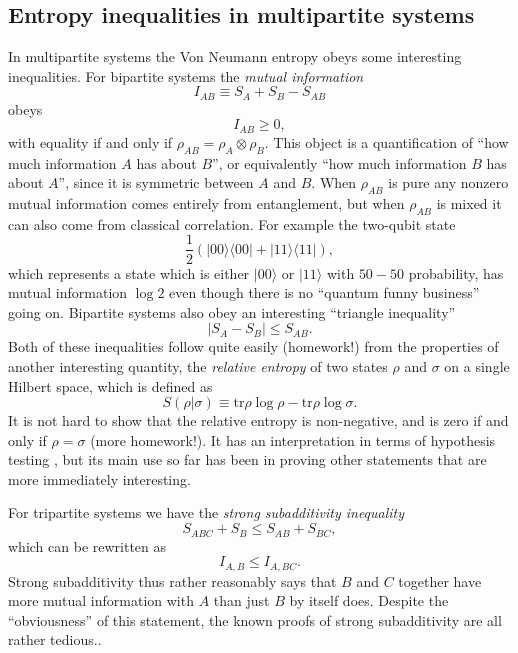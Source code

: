 \documentclass[12pt]{article}
\newcommand{\be}{\begin{equation}}
\newcommand{\ee}{\end{equation}}
\newcommand{\lan}{\langle}
\newcommand{\ran}{\rangle}
\newcommand{\tr}{\mathrm{tr}}
\begin{document}
\subsection{Entropy inequalities in multipartite systems}
In multipartite systems the Von Neumann entropy obeys some interesting inequalities.  For bipartite systems the \textit{mutual information}
\be
I_{AB}\equiv S_A+S_B-S_{AB}
\ee
obeys
\be\label{Ipos}
I_{AB}\geq 0,
\ee
with equality if and only if $\rho_{AB}=\rho_A\otimes \rho_B$.  This object is a quantification of ``how much information  $A$ has about $B$'', or equivalently ``how much information $B$ has about $A$'', since it is symmetric between $A$ and $B$.  When $\rho_{AB}$ is pure any nonzero mutual information comes entirely from entanglement, but when $\rho_{AB}$ is mixed it can also come from classical correlation.  For example the two-qubit state
\be
\frac{1}{2}\left(|00\ran\lan 00 |+|11\ran \lan 11|\right),
\ee
which represents a state which is either $|00\ran$ or $|11\ran$ with $50-50$ probability, has mutual information $\log 2$ even though there is no ``quantum funny business'' going on.  
Bipartite systems also obey an interesting ``triangle inequality''
\be\label{triangle}
|S_A-S_B|\leq S_{AB}.
\ee
Both of these inequalities follow quite easily (homework!) from the properties of another interesting quantity, the \textit{relative entropy} of two states $\rho$ and $\sigma$ on a single Hilbert space, which is defined as
\be
S(\rho|\sigma)\equiv \tr \rho \log \rho-\tr \rho \log \sigma.
\ee
It is not hard to show that the relative entropy is non-negative, and is zero if and only if $\rho=\sigma$ (more homework!).  It has an interpretation in terms of hypothesis testing \cite{Vedral:2002zz}, but its main use so far has been in proving other statements that are more immediately interesting.


For tripartite systems we have the \textit{strong subadditivity inequality}
\be
S_{ABC}+S_B\leq S_{AB}+S_{BC},
\ee
which can be rewritten as
\be
I_{A,B}\leq I_{A,BC}.
\ee
Strong subadditivity thus rather reasonably says that $B$ and $C$ together have more mutual information with $A$ than just $B$ by itself does.  Despite the ``obviousness'' of this statement, the known proofs of strong subadditivity are all rather tedious.\cite{nielsen2010quantum}.  
\end{document}
